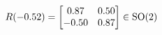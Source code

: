 \documentclass[preview]{standalone}
\begin{document}
\begin{align*}
\special{dvisvgm:raw <g id='unique000'>}R(-0.52) = \begin{bmatrix} 0.87 & 0.50 \\ -0.50 & 0.87 \end{bmatrix} \in \text{SO}(2)\special{dvisvgm:raw </g>}
\end{align*}
\end{document}
